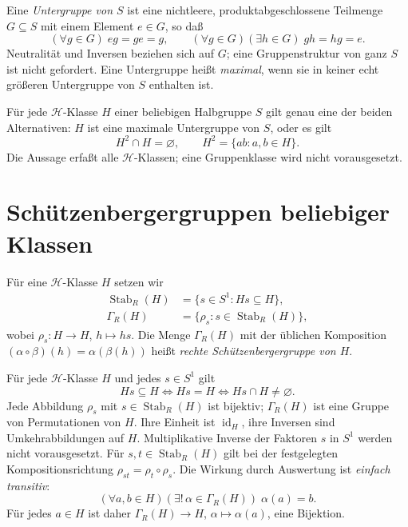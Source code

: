 \begin{definition}
\label{b28guide:def:subgroup}
Eine \emph{Untergruppe von $S$} ist eine nichtleere,
produktabgeschlossene Teilmenge $G\subseteq S$ mit einem Element
$e\in G$, so daß
\[
(\forall g\in G)\;eg=ge=g,
\qquad
(\forall g\in G)(\exists h\in G)\;gh=hg=e.
\]
Neutralität und Inversen beziehen sich auf $G$; eine Gruppenstruktur
von ganz $S$ ist nicht gefordert. Eine Untergruppe heißt \emph{maximal},
wenn sie in keiner echt größeren Untergruppe von $S$ enthalten ist.
\end{definition}

\begin{theorem}
\label{b28guide:thm:green-group}
Für jede $\mathcal H$-Klasse $H$ einer beliebigen Halbgruppe $S$
gilt genau eine der beiden Alternativen: $H$ ist eine maximale
Untergruppe von $S$, oder es gilt
\[
 H^2\cap H=\varnothing,\qquad H^2=\{ab:a,b\in H\}.
\]
Die Aussage erfaßt alle $\mathcal H$-Klassen; eine Gruppenklasse
wird nicht vorausgesetzt.
\cite{harju,howie}
\end{theorem}

\section{Schützenbergergruppen beliebiger Klassen}

\begin{definition}
\label{b28guide:def:schutzenberger}
Für eine $\mathcal H$-Klasse $H$ setzen wir
\[
\begin{aligned}
\operatorname{Stab}_{R}(H)&=\{s\in S^1:Hs\subseteq H\},\\
\Gamma_R(H)&=\{\rho_s:s\in\operatorname{Stab}_{R}(H)\},
\end{aligned}
\]
wobei $\rho_s:H\longrightarrow H$, $h\longmapsto hs$.
Die Menge $\Gamma_R(H)$ mit der üblichen Komposition
$(\alpha\circ\beta)(h)=\alpha(\beta(h))$ heißt
\emph{rechte Schützenbergergruppe von $H$}.
\end{definition}

\begin{theorem}
\label{b28guide:thm:schutzenberger-action}
Für jede $\mathcal H$-Klasse $H$ und jedes $s\in S^1$ gilt
\[
Hs\subseteq H\iff Hs=H\iff Hs\cap H\ne\varnothing.
\]
Jede Abbildung $\rho_s$ mit $s\in\operatorname{Stab}_{R}(H)$ ist
bijektiv; $\Gamma_R(H)$ ist eine Gruppe von Permutationen von $H$.
Ihre Einheit ist $\operatorname{id}_H$, ihre Inversen sind
Umkehrabbildungen auf $H$. Multiplikative Inverse der Faktoren $s$
in $S^1$ werden nicht vorausgesetzt.
Für $s,t\in\operatorname{Stab}_{R}(H)$ gilt bei der festgelegten
Kompositionsrichtung $\rho_{st}=\rho_t\circ\rho_s$.
Die Wirkung durch Auswertung ist \emph{einfach transitiv}:
\[
(\forall a,b\in H)(\exists!\,\alpha\in\Gamma_R(H))\;
\alpha(a)=b.
\]
Für jedes $a\in H$ ist daher
$\Gamma_R(H)\longrightarrow H$, $\alpha\longmapsto\alpha(a)$,
eine Bijektion.
\cite{brookes2024,howie}
\end{theorem}

